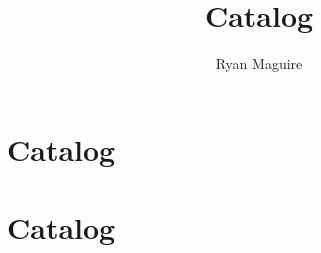 \documentclass[crop=false,class=book,oneside]{standalone}
\begin{document}
    \ifx\ifplanetdiff\undefined
        \title{Catalog}
        \author{Ryan Maguire}
        \date{\vspace{-5ex}}
        \maketitle
        \tableofcontents
        \clearpage
        \chapter*{Catalog}
        \setcounter{chapter}{6}
    \else
        \chapter{Catalog}
    \fi
\end{document}

